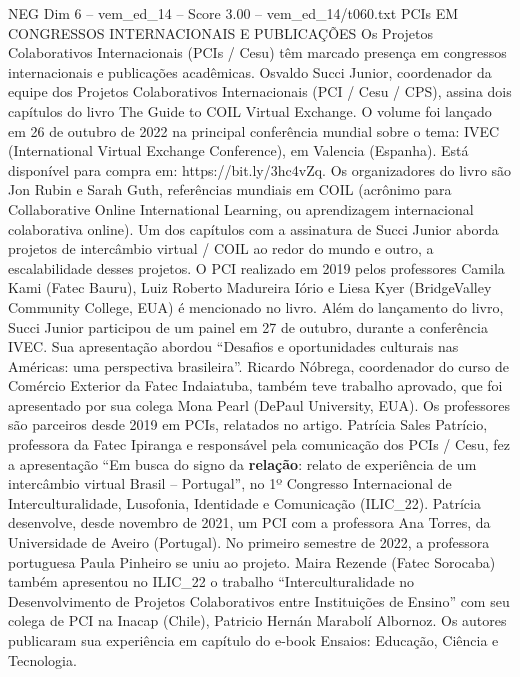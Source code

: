 \begin{textsample}{NEG Dim 6 – vem\_ed\_14 – Score 3.00 – vem\_ed\_14/t060.txt}  \label{ex:f6_neg_080}
PCIs EM CONGRESSOS INTERNACIONAIS E PUBLICAÇÕES Os Projetos Colaborativos Internacionais (PCIs / Cesu) têm marcado presença em congressos internacionais e publicações acadêmicas.
Osvaldo Succi Junior, coordenador da equipe dos Projetos Colaborativos Internacionais (PCI / Cesu / CPS), assina dois capítulos do livro The Guide to COIL Virtual Exchange.
O volume foi lançado em 26 de outubro de 2022 na principal conferência mundial sobre o tema: IVEC (International Virtual Exchange Conference), em Valencia (Espanha).
Está disponível para compra em: https://bit.ly/3hc4vZq.
Os organizadores do livro são Jon Rubin e Sarah Guth, referências mundiais em COIL (acrônimo para Collaborative Online International Learning, ou aprendizagem internacional colaborativa online).
Um dos capítulos com a assinatura de Succi Junior aborda projetos de intercâmbio virtual / COIL ao redor do mundo e outro, a escalabilidade desses projetos.
O PCI realizado em 2019 pelos professores Camila Kami (Fatec Bauru), Luiz Roberto Madureira Iório e Liesa Kyer (BridgeValley Community College, EUA) é mencionado no livro.
Além do lançamento do livro, Succi Junior participou de um painel em 27 de outubro, durante a conferência IVEC.
Sua apresentação abordou “Desafios e oportunidades culturais nas Américas: uma perspectiva brasileira”.
Ricardo Nóbrega, coordenador do curso de Comércio Exterior da Fatec Indaiatuba, também teve trabalho aprovado, que foi apresentado por sua colega Mona Pearl (DePaul University, EUA).
Os professores são parceiros desde 2019 em PCIs, relatados no artigo.
Patrícia Sales Patrício, professora da Fatec Ipiranga e responsável pela comunicação dos PCIs / Cesu, fez a apresentação “Em busca do signo da \textbf{relação}: relato de experiência de um intercâmbio virtual Brasil – Portugal”, no 1º Congresso Internacional de Interculturalidade, Lusofonia, Identidade e Comunicação (ILIC\_22).
Patrícia desenvolve, desde novembro de 2021, um PCI com a professora Ana Torres, da Universidade de Aveiro (Portugal).
No primeiro semestre de 2022, a professora portuguesa Paula Pinheiro se uniu ao projeto.
Maira Rezende (Fatec Sorocaba) também apresentou no ILIC\_22 o trabalho “Interculturalidade no Desenvolvimento de Projetos Colaborativos entre Instituições de Ensino” com seu colega de PCI na Inacap (Chile), Patricio Hernán Marabolí Albornoz.
Os autores publicaram sua experiência em capítulo do e-book Ensaios: Educação, Ciência e Tecnologia.

\end{textsample}

